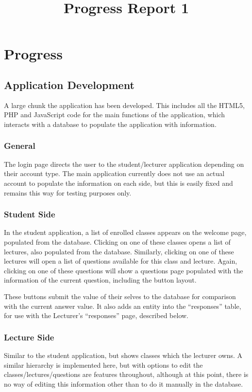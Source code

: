 \documentclass{article}
\title{
\textmd{\textbf{Progress Report 1}}\\
}
\author{\textbf{\hmwkAuthorName}}
\begin{document}
\newpage
\section{Progress}
\subsection{Application Development}
A large chunk the application has been developed. This includes all the HTML5, PHP and JavaScript code for the main functions of the application, which interacts with a database to populate the application with information.

\subsubsection{General}
The login page directs the user to the student/lecturer application depending on their account type. The main application currently does not use an actual account to populate the information on each side, but this is easily fixed and remains this way for testing purposes only.

\subsubsection{Student Side}
In the student application, a list of enrolled classes appears on the welcome page, populated from the database. Clicking on one of these classes opens a list of lectures, also populated from the database. Similarly, clicking on one of these lectures will open a list of questions available for this class and lecture. Again, clicking on one of these questions will show a questions page populated with the information of the current question, including the button layout.

These buttons submit the value of their selves to the database for comparison with the current answer value. It also adds an entity into the ``responses'' table, for use with the Lecturer's ``responses'' page, described below.

\subsubsection{Lecture Side}
Similar to the student application, but shows classes which the lecturer owns. A similar hierarchy is implemented here, but with options to edit the classes/lectures/questions are features throughout, although at this point, there is no way of editing this information other than to do it manually in the database.
\end{document}
